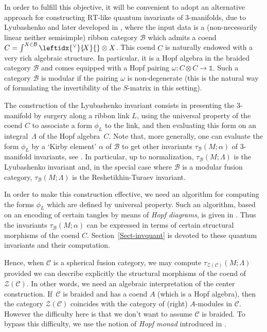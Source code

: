 \documentclass[a4paper]{amsart}
\theoremstyle{definition}
\newcommand{\co}{\colon}
\newcommand{\cc}{\mathcal{C}}
\newcommand{\bb}{\mathcal{B}}
\newcommand{\zz}{\mathcal{Z}}
\newcommand{\trait}{\nobreakdash-\hspace{0pt}}
\newcommand{\un}{\mathbb{1}}
\newcommand{\ldual}[1]{\leftidx{^\vee}{\!#1}{}}
\begin{document}
\medskip
In order to fulfill this objective, it will be convenient to adopt an alternative approach for constructing
$\mathrm{RT}$-like quantum invariants of $3$\trait manifolds, due to Lyubashenko \cite{Lyu2} and later developed in
\cite{LyuKer,Vir}, where the input data is a  (non-necessarily linear neither semisimple)  ribbon category $\bb$ which
admits a coend $C=\int^{X \in \bb} \ldual{X} \otimes X$. This coend $C$ is naturally endowed with a very rich algebraic
structure. In particular, it is a Hopf algebra in the braided category $\bb$ and comes equipped  with a Hopf pairing $\omega
\co C\otimes C \to \un$. Such a category $\bb$ is modular if the pairing $\omega$ is non-degenerate (this is the natural way
of formulating the invertibility of the $S$-matrix in this setting).

The construction of the Lyubashenko invariant consists in presenting the $3$\trait manifold by surgery along a ribbon link $L$,
using the universal property of the coend $C$ to associate a form $\phi_L$ to the link, and then evaluating this form on
an integral~$\Lambda$ of the Hopf algebra~$C$. Note that, more generally, one can evaluate the form $\phi_L$ by a `Kirby
element' $\alpha$ of $\bb$ to get other invariants $\tau_\bb(M;\alpha)$ of $3$-manifold invariants, see \cite{Vir}.
In particular, up to normalization, $\tau_\bb(M;\Lambda)$ is the Lyubashenko invariant and, in the special case where $\bb$ is a modular fusion category, $\tau_\bb(M;\Lambda)$ is the Reshetikhin-Turaev invariant.

In order to make this construction effective, we need an algorithm for computing the forms $\phi_L$ which are defined by
universal property. Such an algorithm, based on an encoding of certain tangles by means of \emph{Hopf diagrams}, is given in
\cite{BV1}. Thus the invariants $\tau_\bb(M;\alpha)$ can be expressed in terms of certain structural morphisms of the coend
$C$. Section~\ref{Sect-invquant} is devoted to these quantum invariants and their computation.

\medskip
Hence, when $\cc$ is a spherical fusion category, we may compute $\tau_{\zz(\cc)}(M;\Lambda)$ provided we
can describe explicitly the structural morphisms of the coend of $\zz(\cc)$. In other words, we need an algebraic
interpretation of the center construction. If~$\cc$ is braided and has a coend $A$ (which is a Hopf algebra), then the category
$\zz(\cc)$ coincides with the category of (right) $A$-modules in $\cc$. However the difficulty here is that we don't want to
assume $\cc$ is braided. To bypass this difficulty, we use the notion of \emph{Hopf monad} introduced in \cite{BV2}.
\end{document}
